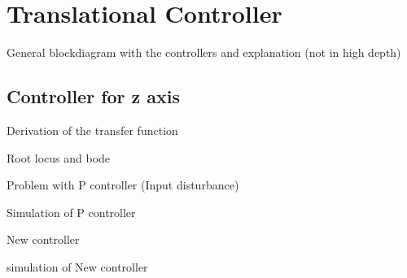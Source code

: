 \section{Translational Controller} \label{sec:TranslationalController}

General blockdiagram with the controllers and explanation (not in high depth)




\subsection{Controller for z axis}
Derivation of the transfer function 

Root locus and bode

Problem with P controller (Input disturbance)

Simulation of P controller

New controller 

simulation of New controller

